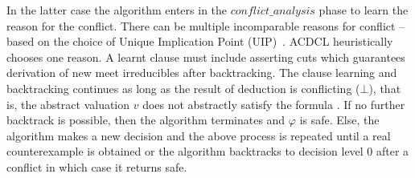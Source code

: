 In the latter case the algorithm enters in the
$\mathit{conflict\_analysis}$ phase to learn the reason for the
conflict.  There can be multiple incomparable reasons for conflict --
based on the choice of Unique Implication Point (UIP)~\cite{cdcl}.
ACDCL heuristically chooses one reason.  A learnt clause must include
asserting cuts which guarantees derivation of new meet irreducibles
after backtracking. The clause learning and backtracking continues as
long as the result of deduction is conflicting ($\bot$), that is, the
abstract valuation $v$ does not abstractly satisfy the formula
.  If no further backtrack is possible, then the
algorithm terminates and $\varphi$ is \textsf{safe}. Else, the
algorithm makes a new decision and the above process is repeated until
a real counterexample  is obtained or the
algorithm backtracks to decision level 0 after a conflict in which
case it returns \textsf{safe}.

